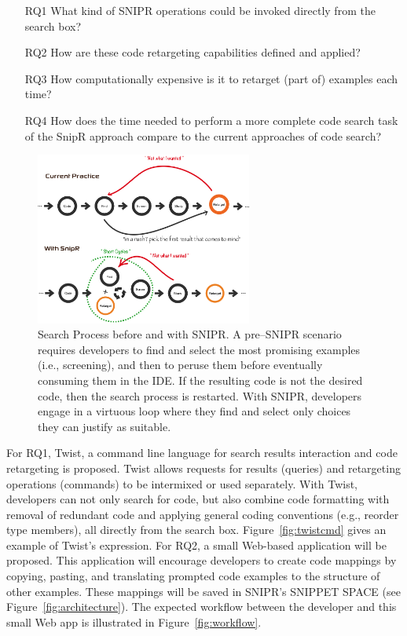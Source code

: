 \documentclass[conference]{IEEEtran}
\begin{document}
\begin{itemize}  
\item[RQ1] What kind of \uppercase{SnipR} operations could be invoked directly from the search box?
\item[RQ2] How are these code retargeting capabilities defined and applied?
\item[RQ3] How computationally expensive is it to retarget (part of) examples each time?
\item[RQ4] How does the time needed to perform a more complete code search task of the SnipR approach compare to the current approaches of code search? 
\end{itemize}

\begin{figure}[!t]
    \centering
    \includegraphics[width=2.8in]{images/halfsearchprocess}
    \caption{Search Process before and with \uppercase{SnipR}. A pre--\uppercase{SnipR} scenario requires developers to find and select the most promising examples (i.e., screening), and then to peruse them before eventually consuming them in the IDE. If the resulting code is not the desired code, then the search process is restarted. With \uppercase{SnipR}, developers engage in a virtuous loop where they find and select only choices they can justify as suitable.}
    \label{fig:retargeting}
\end{figure}
For RQ1, Twist, a command line language for search results interaction and code retargeting is proposed. Twist allows requests for results (queries) and retargeting operations (commands) to be intermixed or used separately. With Twist, developers can not only search for code, but also combine code formatting with removal of redundant code and applying general coding conventions (e.g., reorder type members), all directly from the search box. Figure~\ref{fig:twistcmd} gives an example of Twist's expression. For RQ2, a small Web-based application will be proposed. This application will encourage developers to create code mappings by copying, pasting, and translating prompted code examples to the structure of other examples. These mappings will be saved in SNIPR's SNIPPET SPACE (see Figure~\ref{fig:architecture}). The expected workflow between the developer and this small Web app is illustrated in Figure~\ref{fig:workflow}. 
\end{document}
